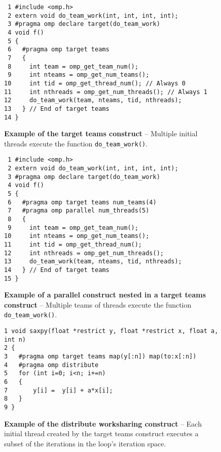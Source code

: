 \begin{figure*}[!tb]
\begin{verbatim}
 1 #include <omp.h>
 2 extern void do_team_work(int, int, int, int);
 3 #pragma omp declare target(do_team_work)
 4 void f()
 5 {
 6   #pragma omp target teams
 7   {
 8     int team = omp_get_team_num();
 9     int nteams = omp_get_num_teams();
10     int tid = omp_get_thread_num(); // Always 0
11     int nthreads = omp_get_num_threads(); // Always 1
12     do_team_work(team, nteams, tid, nthreads);
13   } // End of target teams
14 }
\end{verbatim}
\caption{ \textbf {Example of the target teams construct } -- \small
          Multiple initial threads execute the function \texttt{do\_team\_work()}.     
         }
\label{figure:chapter6-teams-v1}
\end{figure*}


\begin{figure*}[!tbh]
\begin{verbatim}
 1 #include <omp.h>
 2 extern void do_team_work(int, int, int, int);
 3 #pragma omp declare target(do_team_work)
 4 void f()
 5 {
 6   #pragma omp target teams num_teams(4)
 7   #pragma omp parallel num_threads(5)
 8   {
 9     int team = omp_get_team_num();
10     int nteams = omp_get_num_teams();
11     int tid = omp_get_thread_num();
12     int nthreads = omp_get_num_threads();
13     do_team_work(team, nteams, tid, nthreads);
14   } // End of target teams
15 }
\end{verbatim}
\caption{ \textbf {Example of a parallel construct nested in a 
                   target teams construct} -- \small
          Multiple teams of threads execute the function \texttt{do\_team\_work()}.     
         }
\label{figure:chapter6-teams-v2}
\end{figure*}


\begin{figure*}[!tb]
\begin{verbatim}
1 void saxpy(float *restrict y, float *restrict x, float a, int n)
2 {
3   #pragma omp target teams map(y[:n]) map(to:x[:n]) 
4   #pragma omp distribute
5   for (int i=0; i<n; i+=n)
6   {
7       y[i] =  y[i] + a*x[i];
8   }
9 }
\end{verbatim}
\caption{ \textbf {Example of the distribute worksharing construct} -- \small
          Each initial thread created by the target teams construct 
          executes a subset of the iterations in the loop's iteration space.
         }
\label{figure:chapter6-distribute-v1}
\end{figure*}


